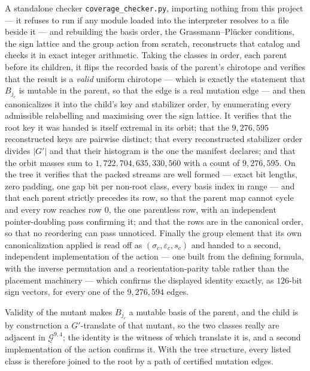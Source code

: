 \documentclass[11pt]{amsart}
\theoremstyle{remark}
\newcommand{\Gu}{\underline{\mathcal{G}}}
\begin{document}
A standalone checker \texttt{coverage\_checker.py}, importing nothing from
this project --- it refuses to run if any module loaded into the
interpreter resolves to a file beside it --- and rebuilding the basis
order, the Grassmann--Pl\"ucker conditions, the sign lattice and the group
action from scratch, reconstructs that catalog and checks it in exact
integer arithmetic. Taking the classes in order, each parent before its
children, it flips the recorded basis of the parent's chirotope and
verifies that the result is a \emph{valid} uniform chirotope --- which is
exactly the statement that $B_{j_c}$ is mutable in the parent, so that the
edge is a real mutation edge --- and then canonicalizes it into the
child's key and stabilizer order, by enumerating every admissible
relabelling and maximising over the sign lattice. It verifies that the
root key it was handed is itself extremal in its orbit; that the
$9{,}276{,}595$ reconstructed keys are pairwise distinct; that every
reconstructed stabilizer order divides $|G'|$ and that their histogram is
the one the manifest declares; and that the orbit masses sum to
$1{,}722{,}704{,}635{,}330{,}560$ with a count of $9{,}276{,}595$. On the
tree it verifies that the packed streams are well formed --- exact bit
lengths, zero padding, one gap bit per non-root class, every basis index
in range
--- and that each parent strictly precedes its row, so that the parent map
cannot cycle and every row reaches row $0$, the one parentless row, with
an independent pointer-doubling pass confirming it; and that the rows are
in the canonical order, so that no reordering can pass unnoticed. Finally
the group element that its own canonicalization applied is read off as
$(\sigma_c,\varepsilon_c,s_c)$ and handed to a second, independent
implementation of the action --- one built from the defining formula, with
the inverse permutation and a reorientation-parity table rather than the
placement machinery --- which confirms the displayed identity exactly, as
$126$-bit sign vectors, for every one of the $9{,}276{,}594$ edges.

Validity of the mutant makes $B_{j_c}$ a mutable basis of the parent, and
the child is by construction a $G'$-translate of that mutant, so the two
classes really are adjacent in $\Gu^{9,4}$; the identity is the witness of
which translate it is, and a second implementation of the action confirms
it. With the tree structure, every listed class is therefore joined to the
root by a path of certified mutation edges.
\end{document}
